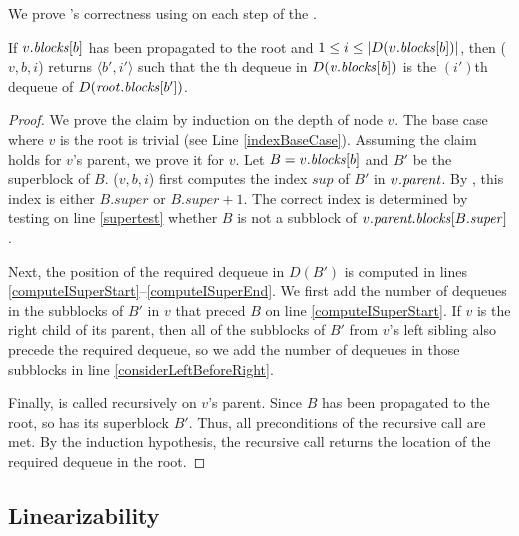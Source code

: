 
We prove 's correctness using  on each step of the .

\begin{lemma}\label{lem::indexDequeue}
If $v.\mbox{\textit{blocks}}[b]$ has been propagated to the root and $1\leq i\leq |D(v.\mbox{\textit{blocks}}[b])|$, 
 then ($v, b, i$) returns $\langle b',i'\rangle$ such that the th dequeue in $D(\mbox{\textit{v}}.\mbox{\textit{blocks}}[\mbox{\textit{b}}])$ is the $(i')$th dequeue of $D(\mbox{\textit{root}}.\mbox{\textit{blocks}}[b'])$.
\end{lemma}
\begin{proof}
We prove the claim by induction on the depth of node $v$. The base case where $v$ is the root is trivial (see Line \ref{indexBaseCase}).
Assuming the claim holds for $v$'s parent, we prove it for $v$.
Let $B=v.\mbox{\textit{blocks}}[b]$ and $B'$ be the superblock of $B$.
($v, b, i$) first computes the index $sup$ of $B'$ in $v.\mbox{\textit{parent}}$.
By , this index is either $B.super$ or $B.super+1$.
The correct index is determined by testing on line \ref{supertest} whether $B$ is not a subblock of $v.\mbox{\textit{parent.blocks}}[B.\mbox{\textit{super}}]$.

Next, the position of the required dequeue in $D(B')$ is computed in 
lines \ref{computeISuperStart}--\ref{computeISuperEnd}. 
We first add the number of dequeues in the subblocks of $B'$ in $v$ that preced $B$ on line \ref{computeISuperStart}.
If $v$ is the right child of its parent, then all of the subblocks of $B'$ from $v$'s left sibling
also precede the required dequeue, so we add the number of dequeues in those subblocks in line \ref{considerLeftBeforeRight}.

Finally,  is called recursively on $v$'s parent.
Since $B$ has been propagated to the root, so has its superblock $B'$.
Thus, all preconditions of the recursive call are met.
By the induction hypothesis, the recursive call returns the location of the required dequeue in the root.\end{proof}

\subsection{Linearizability}

